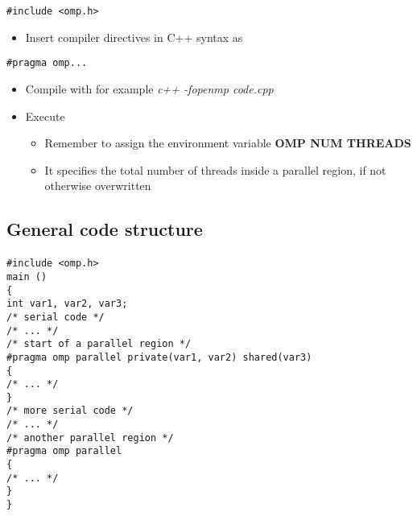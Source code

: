\documentclass[%
oneside,                 %
final,                   %
10pt]{article}
\begin{document}
\noindent
\begin{verbatim}
#include <omp.h>
\end{verbatim}
\begin{itemize}
 \item Insert compiler directives in C++ syntax as 
\end{itemize}

\noindent
\begin{verbatim}
#pragma omp...
\end{verbatim}
\begin{itemize}
\item Compile with for example \emph{c++ -fopenmp code.cpp}

\item Execute
\begin{itemize}

  \item Remember to assign the environment variable \textbf{OMP NUM THREADS}

  \item It specifies the total number of threads inside a parallel region, if not otherwise overwritten
\end{itemize}

\noindent
\end{itemize}

\noindent



\subsection*{General code structure}

\paragraph{}
\begin{verbatim}
#include <omp.h>
main ()
{
int var1, var2, var3;
/* serial code */
/* ... */
/* start of a parallel region */
#pragma omp parallel private(var1, var2) shared(var3)
{
/* ... */
}
/* more serial code */
/* ... */
/* another parallel region */
#pragma omp parallel
{
/* ... */
}
}
\end{verbatim}
\end{document}
